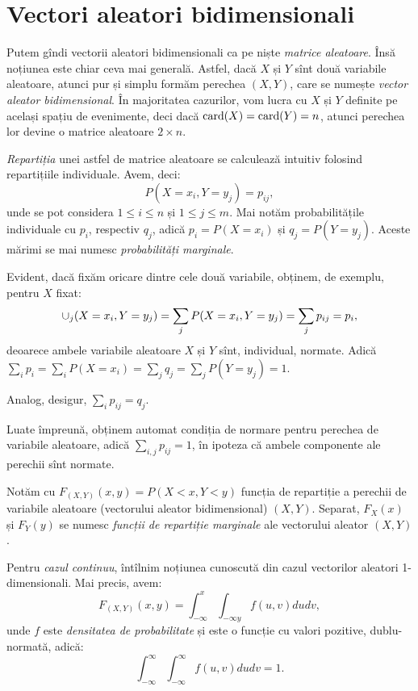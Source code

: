 
\chapter{Vectori aleatori bidimensionali}

Putem gîndi vectorii aleatori bidimensionali ca pe niște \emph{matrice %
  aleatoare}. Însă noțiunea este chiar ceva mai generală. Astfel, dacă
$ X $ și $ Y $ sînt două variabile aleatoare, atunci pur și simplu
formăm perechea $ (X, Y) $, care se numește \emph{vector aleator bidimensional}.
În majoritatea cazurilor, vom lucra cu $ X $ și $ Y $ definite pe același spațiu
de evenimente, deci dacă $ \mathrm{card}(X) = \mathrm{card}(Y) = n $, atunci perechea
lor devine o matrice aleatoare $ 2 \times n $.

\emph{Repartiția} unei astfel de matrice aleatoare se calculează intuitiv
folosind repartițiile individuale. Avem, deci:
\[
  P(X = x_i, Y = y_j) = p_{ij},
\]
unde se pot considera $ 1 \leq i \leq n $ și $ 1 \leq j \leq m $.
Mai notăm probabilitățile individuale cu $ p_i $, respectiv $ q_j $,
adică $ p_i = P(X = x_i) $ și $ q_j = P(Y = y_j) $. Aceste mărimi se mai
numesc \emph{probabilități marginale}.

Evident, dacă fixăm oricare dintre cele două variabile, obținem, de exemplu,
pentru $ X $ fixat:
\[
  \displaystyle\cup_j (X = x_i, Y = y_j) = \sum_j P(X = x_i, Y = y_j) = \sum_j p_{ij} = p_i,
\]
deoarece ambele variabile aleatoare $ X $ și $ Y $ sînt, individual, normate.
Adică $ \sum_i p_i = \sum_i P(X = x_i) = \sum_j q_j = \sum_j P(Y = y_j) = 1 $.

Analog, desigur, $ \sum_i p_{ij} = q_j $.

Luate împreună, obținem automat condiția de normare pentru perechea de
variabile aleatoare, adică $ \sum_{i,j} p_{ij} = 1 $, în ipoteza că ambele
componente ale perechii sînt normate.

Notăm cu $ F_{(X, Y)}(x, y) = P(X < x, Y < y) $ funcția de repartiție
a perechii de variabile aleatoare (vectorului aleator bidimensional) $ (X, Y) $.
Separat, $ F_X(x) $ și $ F_Y(y) $ se numesc \emph{funcții de repartiție marginale}
ale vectorului aleator $ (X, Y) $.

Pentru \emph{cazul continuu}, întîlnim noțiunea cunoscută din cazul vectorilor
aleatori 1-dimensionali. Mai precis, avem:
\[
  F_{(X, Y)} (x, y) = \int_{-\infty}^x \int_{-\infty y} f(u, v) dudv,
\]
unde $ f $ este \emph{densitatea de probabilitate} și este o funcție cu
valori pozitive, dublu-normată, adică:
\[
  \int_{-\infty}^\infty \int_{-\infty}^\infty f(u, v) du dv = 1.
\]

